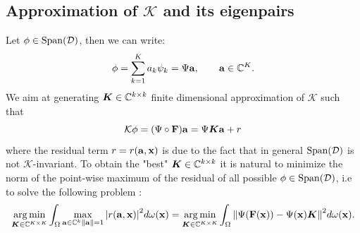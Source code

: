 \subsection{Approximation of $\mathcal{K}$ and its eigenpairs}
Let $\phi\in\mathrm{Span}(\mathcal{D})$, then we can write:
\begin{equation*}
    \phi = \sum_{k=1}^K a_k\psi_k = \Psi\vb{a}, \qquad \vb{a}\in\mathbb{C}^K.
\end{equation*}
We aim at generating $\vb*{K}\in\mathbb{C}^{k\times k}$ finite dimensional approximation of $\mathcal{K}$ such that
\begin{equation}
    \label{k_finite_dimensional}
    \mathcal{K}\vb{\phi} = (\Psi \circ \vb{F})\vb{a} = \Psi\vb*K\vb{a} + r
\end{equation}
where the residual term $r = r(\vb{a}, \vb{x})$ is due to the fact that in general $\mathrm{Span}(\mathcal{D})$ is not $\mathcal{K}$-invariant. To obtain the "best" $\vb*{K}\in\mathbb{C}^{k\times k}$ it is natural to minimize the norm of the point-wise maximum of the residual of all possible $\phi\in\mathrm{Span}(\mathcal{D})$, i.e to solve the following problem \cite{colbrook_rigorous_2021}:
\begin{equation}
    \label{edmd_integral_problem}
    \operatorname*{arg\,min}_{\vb*{K}\in\mathbb{C}^{K\times K}}\int_{\Omega} \max_{\vb{a}\in\mathbb{C}^k \\ \norm{\vb{a}} = 1}\abs{r(\vb{a}, \vb{x})}^2 d\omega(\vb{x}) = 
    \operatorname*{arg\,min}_{\vb*{K}\in\mathbb{C}^{K\times K}}\int_{\Omega} \norm{\Psi(\vb{F}(\vb{x})) - \Psi(\vb{x})\vb*{K}}^2 d\omega(\vb{x}).
\end{equation}

